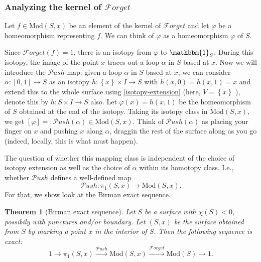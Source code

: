 \documentclass[reqno]{amsart}
\newtheorem{theorem}{Theorem}[section]
\theoremstyle{definition}
\theoremstyle{remark}
\newcommand{\Mod}{{\mathrm{Mod}}}
\newcommand{\Push}{{\mathcal{P}}ush}
\newcommand{\Forget}{{\mathcal{F}}orget}
\begin{document}
 

 \subsubsection{Analyzing the kernel of $\Forget$}

 Let $f \in \Mod(S,x)$ be an element of the kernel
 of $\Forget$ and let  $\varphi $ be a homeomorphism
 representing $f$. We can think of
 $\varphi $ as a homeomorphism $\overline{\varphi}$ of
 $S$.

 Since $\Forget (f) = 1$, there is an isotopy
 from $\overline{\varphi }$ to $\mathbbm{1}_S$. During
 this isotopy, the image of the point $x$ traces out a
 loop $\alpha$ in $S$ based at $x$. Now
 we will introduce the $\Push$ map:
 given a loop $\alpha$ in $S$ based at $x$, we can
 consider $\alpha \colon \left[ 0,1 \right] \to S$ as
 an isotopy $h \colon \left\{ x \right\} \times I
 \to S$ with $h(x,0) = h(x,1) = x$ and extend this
 to the whole surface using \ref{isotopy-extension} (here,
 $V = \left\{ x \right\} $ ), denote this by
 $h \colon S \times I \to S$ also. Let
 $\varphi (x) = h(x,1) $ be the homeomorphism
 of $S$ obtained at the end of the isotopy. Taking its
 isotopy class in $\Mod \left( S,x \right) $, we get
 $\left[ \varphi  \right] = : 
 \Push(\alpha) \in \Mod\left( S,x \right) $.
 Think of $\Push(\alpha)$ as placing your finger on
 $x$ and pushing $x$ along $\alpha$, draggin the
 rest of the surface along as you go (indeed, locally,
 this is what must happen).

 The question of whether this mapping class
 is independent of the choice of isotopy extension
 as well as the choice of $\alpha$ within its homotopy class.
 I.e., whether $\Push$ defines a 
 well-defined map
 \[
 \Push \colon \pi_1 \left( S,x \right) 
 \to \Mod \left( S,x \right) .
 \] 
 For that, we show look at the
 Birman exact sequence.






 \begin{theorem}[Birman exact sequence]
     Let $S$ be a surface with $\chi (S) < 0$, possibily
     with punctures and/or boundary. Let
     $\left( S, x \right) $ be the surface
     obtained from $S$ by marking a point $x$ in
     the interior of $S$. Then the following
     sequence is exact:
     \[
         1 \to \pi_1 \left( S, x \right) \stackrel{\Push}{\to }
         \Mod \left( S, x \right) 
         \stackrel{\Forget}{\to } \Mod(S) \to 1.
     \] 
 \end{theorem}
\end{document}
